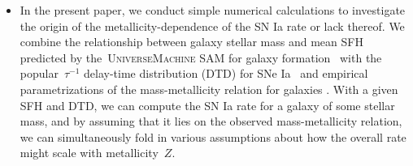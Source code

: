 \documentclass[ms.tex]{subfiles}
\begin{document}
\begin{itemize}
	\item In the present paper, we conduct simple numerical calculations to
	investigate the origin of the metallicity-dependence of the SN Ia rate or
	lack thereof.
	We combine the relationship between galaxy stellar mass and mean SFH
	predicted by the~\textsc{UniverseMachine} SAM for galaxy
	formation~\citep{Behroozi2019} with the popular~$\tau^{-1}$ delay-time
	distribution (DTD) for SNe Ia~\citep[e.g.][]{Maoz2012a} and empirical
	parametrizations of the mass-metallicity relation for galaxies
	\citep{Andrews2013, Zahid2014}.
	With a given SFH and DTD, we can compute the SN Ia rate for a galaxy of
	some stellar mass, and by assuming that it lies on the observed
	mass-metallicity relation, we can simultaneously fold in various
	assumptions about how the overall rate might scale with metallicity~$Z$.

\end{itemize}
\end{document}
